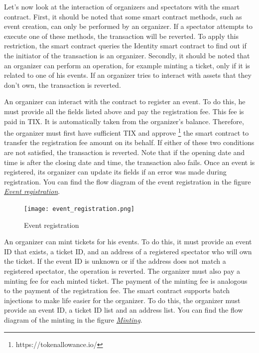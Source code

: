 \documentclass[a4paper,11pt,oneside]{report}
\begin{document}
Let's now look at the interaction of organizers and spectators with the smart contract. First, it should be noted that some smart contract methods, such as event creation, can only be performed by an organizer. If a spectator attempts to execute one of these methods, the transaction will be reverted. To apply this restriction, the smart contract queries the Identity smart contract to find out if the initiator of the transaction is an organizer. Secondly, it should be noted that an organizer can perform an operation, for example minting a ticket, only if it is related to one of his events. If an organizer tries to interact with assets that they don't own, the transaction is reverted.

An organizer can interact with the contract to register an event. To do this, he must provide all the fields listed above and pay the registration fee. This fee is paid in TIX. It is automatically taken from the organizer's balance. Therefore, the organizer must first have sufficient TIX and approve \footnote{https://tokenallowance.io/} the smart contract to transfer the registration fee amount on its behalf. If either of these two conditions are not satisfied, the transaction is reverted. Note that if the opening date and time is after the closing date and time, the transaction also fails. Once an event is registered, its organizer can update its fields if an error was made during registration. You can find the flow diagram of the event registration in the figure  \hyperref[fig:event_registration]{ \textit{Event registration}}.

\begin{figure}[h!]
  \texttt{[image: event\_registration.png]}
  \caption{Event registration}
  \label{fig:event_registration}
\end{figure}

An organizer can mint tickets for his events. To do this, it must provide an event ID that exists, a ticket ID, and an address of a registered spectator who will own the ticket. If the event ID is unknown or if the address does not match a registered spectator, the operation is reverted. The organizer must also pay a minting fee for each minted ticket. The payment of the minting fee is analogous to the payment of the registration fee. The smart contract supports batch injections to make life easier for the organizer. To do this, the organizer must provide an event ID, a ticket ID list and an address list. You can find the flow diagram of the minting in the figure  \hyperref[fig:minting]{ \textit{Minting}}.
\end{document}
